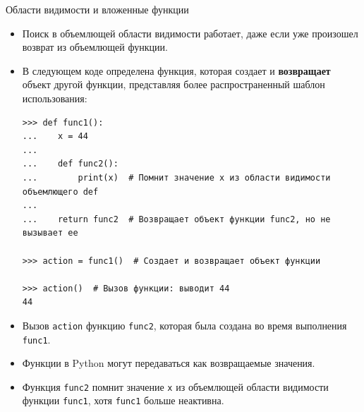 \documentclass[aspectratio=169]{beamer}%
\begin{document}
\begin{frame}[fragile]{Области видимости и вложенные функции}
\scriptsize
\begin{itemize}
\item Поиск в объемлющей области видимости работает, даже если уже произошел возврат из объемлющей функции. 
\item В следующем коде определена функция, которая создает и \textcolor{extraorange}{\textbf{возвращает}} объект другой функции, представляя более распространенный шаблон использования:

\begin{verbatim}
>>> def func1():
...    x = 44
...
...    def func2():
...        print(x)  # Помнит значение x из области видимости объемлющего def 
... 
...    return func2  # Возвращает объект функции func2, но не вызывает ее

>>> action = func1()  # Создает и возвращает объект функции

>>> action()  # Вызов функции: выводит 44
44
\end{verbatim}
\item Вызов \texttt{action}  функцию \texttt{func2}, которая была создана во время выполнения \texttt{func1}. 
\item Функции в Python могут передаваться как возвращаемые значения. 
\item Функция \texttt{func2} помнит значение \texttt{x} из объемлющей области видимости функции \texttt{func1}, хотя \texttt{func1} больше неактивна.
\end{itemize}
\vfill
\end{frame}
\end{document}
